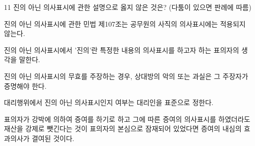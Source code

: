 \begin{question}{11}
진의 아닌 의사표시에 관한 설명으로 옳지 않은 것은? (다툼이 있으면 판례에 따름)
\begin{choices}
  \item 진의 아닌 의사표시에 관한 민법 제107조는 공무원의 사직의 의사표시에는 적용되지 않는다.
  \item 진의 아닌 의사표시에서 '진의'란 특정한 내용의 의사표시를 하고자 하는 표의자의 생각을 말한다.
  \item 진의 아닌 의사표시의 무효를 주장하는 경우, 상대방의 악의 또는 과실은 그 주장자가 증명해야 한다.
  \item 대리행위에서 진의 아닌 의사표시인지 여부는 대리인을 표준으로 정한다.
  \item 표의자가 강박에 의하여 증여를 하기로 하고 그에 따른 증여의 의사표시를 하였더라도 재산을 강제로 뺏긴다는 것이 표의자의 본심으로 잠재되어 있었다면 증여의 내심의 효과의사가 결여된 것이다.
\end{choices}
\end{question}
